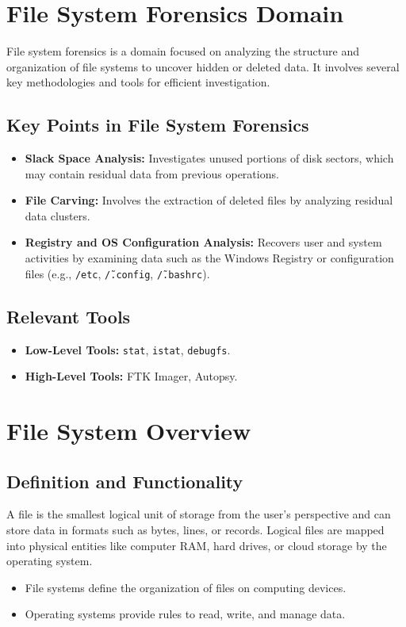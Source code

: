 \section{File System Forensics Domain}
File system forensics is a domain focused on analyzing the structure and organization of file systems to uncover hidden or deleted data. It involves several key methodologies and tools for efficient investigation.

\subsection{Key Points in File System Forensics}
\begin{itemize}
    \item \textbf{Slack Space Analysis:} Investigates unused portions of disk sectors, which may contain residual data from previous operations.
    \item \textbf{File Carving:} Involves the extraction of deleted files by analyzing residual data clusters.
    \item \textbf{Registry and OS Configuration Analysis:} Recovers user and system activities by examining data such as the Windows Registry or configuration files (e.g., \texttt{/etc}, \texttt{\~/.config}, \texttt{\~/.bashrc}).
\end{itemize}

\subsection{Relevant Tools}
\begin{itemize}
    \item \textbf{Low-Level Tools:} \texttt{stat}, \texttt{istat}, \texttt{debugfs}.
    \item \textbf{High-Level Tools:} FTK Imager, Autopsy.
\end{itemize}

\section{File System Overview}
\subsection{Definition and Functionality}
A file is the smallest logical unit of storage from the user’s perspective and can store data in formats such as bytes, lines, or records. Logical files are mapped into physical entities like computer RAM, hard drives, or cloud storage by the operating system.
\begin{itemize}
    \item File systems define the organization of files on computing devices.
    \item Operating systems provide rules to read, write, and manage data.
\end{itemize}

